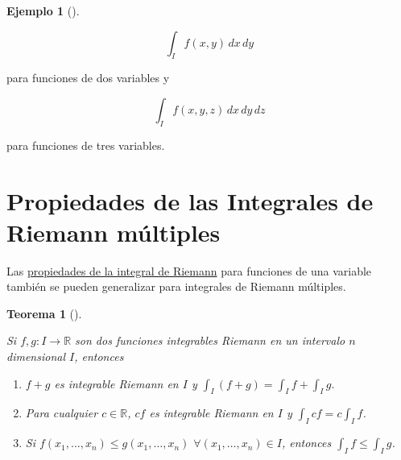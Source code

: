 \documentclass[
  a4paper,
]{scrreport}
\theoremstyle{definition}
\newtheorem{example}{Ejemplo}[chapter]
\theoremstyle{plain}
\theoremstyle{definition}
\theoremstyle{definition}
\theoremstyle{plain}
\newtheorem{theorem}{Teorema}[chapter]
\theoremstyle{plain}
\theoremstyle{remark}
\begin{document}
\begin{example}[]
\begin{tcolorbox}
\[
\int_{I} f(x,y) \,dx\,dy
\]

para funciones de dos variables y

\[
\int_{I} f(x,y,z) \,dx\,dy\,dz 
\]

para funciones de tres variables.

\end{tcolorbox}

\section{Propiedades de las Integrales de Riemann
múltiples}\label{propiedades-de-las-integrales-de-riemann-muxfaltiples}

Las
\href{http://localhost:1313/09-integrales.html\#propiedades-de-la-integral-de-riemann}{propiedades
de la integral de Riemann} para funciones de una variable también se
pueden generalizar para integrales de Riemann múltiples.

\begin{theorem}[]\protect\hypertarget{thm-propiedades-integrales-Riemann-multiples}{}\label{thm-propiedades-integrales-Riemann-multiples}

Si \(f,g:I\to\mathbb{R}\) son dos funciones integrables Riemann en un
intervalo \(n\) dimensional \(I\), entonces

\begin{enumerate}
\def\labelenumi{\alph{enumi}.}
\item
  \(f+g\) es integrable Riemann en \(I\) y
  \(\int_I (f+g) = \int_I f + \int_I g.\)
\item
  Para cualquier \(c\in\mathbb{R}\), \(cf\) es integrable Riemann en
  \(I\) y \(\int_I cf = c\int_I f\).
\item
  Si \(f(x_1,\ldots,x_n) \leq g(x_1,\ldots,x_n)\)
  \(\forall (x_1,\ldots,x_n)\in I\), entonces
  \(\int_I f \leq \int_I g\).
\end{enumerate}

\end{theorem}

\begin{tcolorbox}[enhanced jigsaw, leftrule=.75mm, colbacktitle=quarto-callout-note-color!10!white, toprule=.15mm, opacityback=0, opacitybacktitle=0.6, toptitle=1mm, breakable, bottomtitle=1mm, colframe=quarto-callout-note-color-frame, rightrule=.15mm, titlerule=0mm, title=\textcolor{quarto-callout-note-color}{\faInfo}\hspace{0.5em}{Demostración}, arc=.35mm, left=2mm, bottomrule=.15mm, colback=white, coltitle=black]


\end{tcolorbox}
\end{example}
\end{document}
